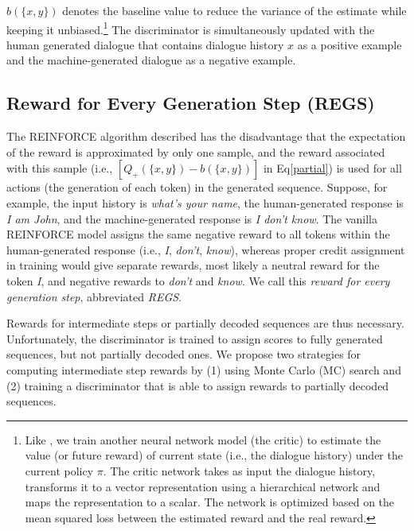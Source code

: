 $b(\{x,y\})$ denotes the baseline value to reduce the variance of the estimate while keeping it unbiased.\footnote{
 Like , 
 we train another neural network model (the critic) to estimate the value (or future reward) of current state (i.e., the dialogue history) under the current policy $\pi$. The critic network takes as input the dialogue history, transforms it to a vector representation using a hierarchical network and maps the representation to a scalar. The network is optimized based on the mean squared loss between the estimated reward and the real reward.} The discriminator is simultaneously updated with the human generated dialogue that contains dialogue history $x$ as a positive example and the machine-generated dialogue as a negative example. 
\subsection{Reward for Every Generation Step (REGS)}
The  REINFORCE algorithm
described has the disadvantage that the expectation of the reward is approximated by only one sample, and the reward associated with this sample 
(i.e.,  $[Q_+(\{x,y\})-b(\{x,y\})]$ in Eq\eqref{partial})
is used for all actions (the generation of each token) in the generated sequence. 
Suppose, for example, the input history is {\it what's your name}, the human-generated response is {\it I am John}, and the machine-generated response is {\it I don't know}. 
The vanilla REINFORCE model assigns the same negative reward to all tokens within the human-generated response (i.e., {\it I}, {\it don't}, {\it know}), whereas 
proper credit assignment in training would  give separate rewards, most likely a neutral reward for the token {\it I}, and negative rewards to {\it don't} and {\it know}. 
We call this {\it reward for every generation step}, abbreviated {\it REGS}.

Rewards for intermediate steps or partially decoded sequences are thus necessary. Unfortunately, the discriminator is trained to assign scores to fully generated sequences, but not partially decoded ones. 
We propose two strategies for computing intermediate step rewards by (1) using Monte Carlo (MC) search and (2) training a discriminator that is able to assign rewards to partially decoded sequences.

